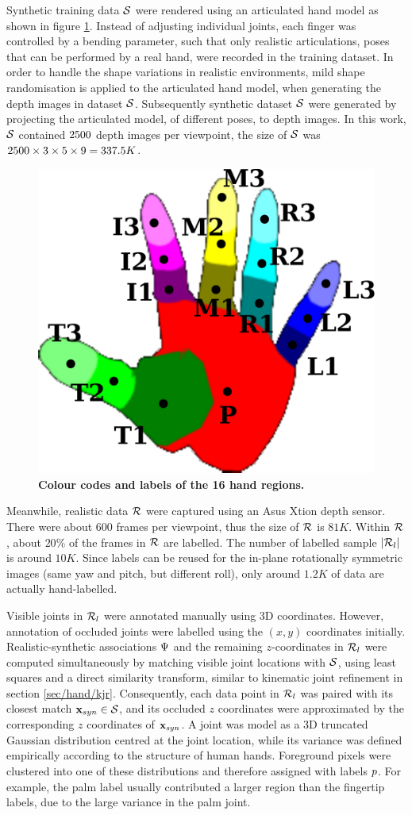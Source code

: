 Synthetic training data $\mathcal{S}$ were rendered using an articulated hand model as shown in figure \ref{fig/hand/label}. 
Instead of adjusting individual joints, each finger was controlled by a bending parameter, such that only realistic articulations, \ie poses that can be performed by a real hand, were recorded in the training dataset. 
In order to handle the shape variations in realistic environments, mild shape randomisation is applied to the articulated hand model, when generating the depth images in dataset $\mathcal{S}$. 
Subsequently synthetic dataset $\mathcal{S}$ were generated by projecting the articulated model, of different poses, to depth images. In this work, $\mathcal{S}$ contained $2500$ depth images per viewpoint, the size of $\mathcal{S}$ was $2500 \times 3 \times 5 \times 9 = 337.5K$.  

\begin{figure}[ht]
	\centering
	\includegraphics[width=0.32\linewidth]{fig/hand/hand.pdf}
	\caption{\textbf{Colour codes and labels of the 16 hand regions.}}
	\label{fig/hand/label}
\end{figure}

Meanwhile, realistic data $\mathcal{R}$ were captured using an Asus Xtion depth sensor. 
There were about $600$ frames per viewpoint, thus the size of $\mathcal{R}$ is $81K$. 
Within $\mathcal{R}$, about $20\%$ of the frames in $\mathcal{R}$ are labelled. 
The number of labelled sample $|\mathcal{R}_{l}|$ is around $10K$.    
Since labels can be reused for the in-plane rotationally symmetric images (same yaw and pitch, but different roll), only around $1.2K$ of data are actually hand-labelled.    

Visible joints in $\mathcal{R}_{l}$ were annotated manually using 3D coordinates. However, annotation of occluded joints were labelled using the $(x,y)$ coordinates initially.  
Realistic-synthetic associations $\mathrm{\Psi}$ and the remaining $z$-coordinates in $\mathcal{R}_{l}$ were computed simultaneously by matching visible joint locations with $\mathcal{S}$, using least squares and a direct similarity transform, similar to kinematic joint refinement in section \ref{sec/hand/kjr}. 
Consequently, each data point in $\mathcal{R}_{l}$ was paired with its closest match $\mathbf{x}_{syn} \in \mathcal{S}$, and its occluded $z$ coordinates were approximated by the corresponding $z$ coordinates of $\mathbf{x}_{syn}$.  
A joint was model as a 3D truncated Gaussian distribution centred at the joint location, while its variance was defined empirically according to the structure of human hands. Foreground pixels were clustered into one of these distributions and therefore assigned with labels $p$. For example, the palm label usually contributed a larger region than the fingertip labels, due to the large variance in the palm joint.

